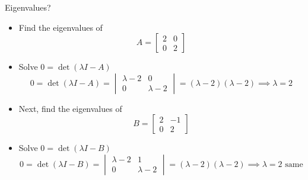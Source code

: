 \documentclass[10pt]{beamer}
\begin{document}
\begin{frame}{Eigenvalues?}
\begin{itemize}
    \item Find the eigenvalues of 
    $$A = \begin{bmatrix}
        2 & 0\\ 0 & 2
    \end{bmatrix}$$
    \item Solve $0=\det(\lambda I- A)$
    $$
        0=\det(\lambda I- A) = \begin{vmatrix}
            \lambda - 2& 0 \\ 0 & \lambda-2
        \end{vmatrix} = (\lambda-2)(\lambda-2) \implies \lambda = 2 
     $$

    \item<2> Next, find the eigenvalues of 
    $$B = \begin{bmatrix}
        2 & -1\\ 0 & 2
    \end{bmatrix}$$
    \item<2> Solve $0=\det(\lambda I- B)$
    $$
        0=\det(\lambda I- B) = \begin{vmatrix}
            \lambda - 2& 1 \\ 0 & \lambda-2
        \end{vmatrix} = (\lambda-2)(\lambda-2) \implies \lambda = 2 \text{ same}
     $$
\end{itemize}
\end{frame}
\end{document}

